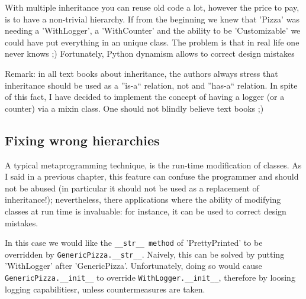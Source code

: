 \documentclass[10pt,english]{article}
\begin{document}
With multiple inheritance you can reuse old code a lot,
however the price to pay, is to have a non-trivial hierarchy. If from
the beginning we knew that 'Pizza' was needing a 'WithLogger', 
a 'WithCounter' and the
ability to be 'Customizable' we could have put everything in an unique
class. The problem is that in real life one never knows ;) 
Fortunately, Python dynamism allows to correct design mistakes

Remark: in all text books about inheritance, the authors always stress
that inheritance should be used as a ''is-a`` relation, not
and ''has-a`` relation. In spite of this fact, I have decided to implement
the concept of having a logger (or a counter) via a mixin class. One 
should not blindly believe text books ;)



\hypertarget{fixing-wrong-hierarchies}{}
\subsection*{Fixing wrong hierarchies}

A typical metaprogramming technique, is the run-time modification of classes.
As I said in a previous chapter, this feature can confuse the programmer and 
should not be abused (in particular it should not be used as a replacement 
of inheritance!); nevertheless, there applications where the ability of 
modifying classes at run time is invaluable: for instance, 
it can be used to correct design mistakes.

In this case we would like the \texttt{{\_}{\_}str{\_}{\_} method} of 'PrettyPrinted' to be
overridden by \texttt{GenericPizza.{\_}{\_}str{\_}{\_}}. Naively, this can be solved by
putting 'WithLogger' after 'GenericPizza'. Unfortunately, doing so 
would cause \texttt{GenericPizza.{\_}{\_}init{\_}{\_}} to override \texttt{WithLogger.{\_}{\_}init{\_}{\_}},
therefore by loosing logging capabilitiesr, unless countermeasures
are taken.
\end{document}
